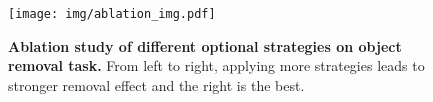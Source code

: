\begin{figure}[t]
    \centering
    \texttt{[image: img/ablation\_img.pdf]}
    \caption{\textbf{Ablation study of different optional strategies on object removal task.} From left to right, applying more strategies leads to stronger removal effect and the right is the best.}
    \label{fig:ablation}
    \vspace{-10pt}
\end{figure}
